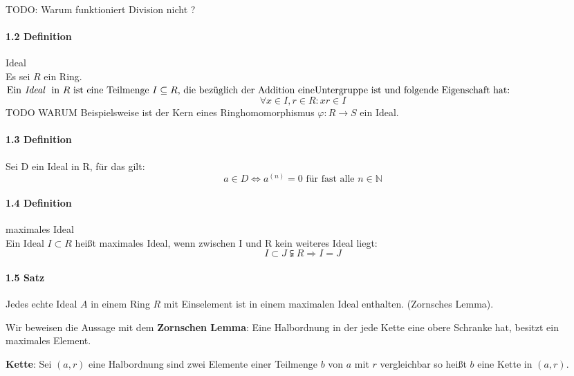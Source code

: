 \documentclass[a4paper]{article}
\begin{document}
TODO: Warum funktioniert Division nicht ? 

\paragraph{1.2 Definition} Ideal \\
Es sei $ R $ ein Ring. \\ 
$ \text{Ein} \textit{ Ideal } \text{ in } R \text{ ist eine Teilmenge } I \subseteq R \text{, die bezüglich der Addition 
eine} \\ \text{Untergruppe ist und folgende Eigenschaft hat:} $
$$ \forall x \in I, r \in R: xr \in I $$
TODO WARUM      Beispielsweise ist der Kern eines Ringhomomorphismus $ \varphi:R \to S $ ein Ideal. 


\paragraph{1.3 Definition} Sei D ein Ideal in R, für das gilt:  
      $$ a \in D \iff a^{(n)} = 0 \text{ für fast alle } n \in \mathbb{N}  $$

\paragraph{1.4 Definition} maximales Ideal \\
Ein Ideal $ I \subset R $ heißt maximales Ideal, wenn zwischen I und R kein weiteres Ideal liegt:
$$ I \subset J \subsetneqq R \Rightarrow I = J$$


\paragraph{1.5 Satz} Jedes echte Ideal $ A $ in einem Ring $ R $ mit Einselement ist in einem maximalen Ideal enthalten. (Zornsches Lemma).
\bigskip

Wir beweisen die Aussage mit dem \textbf{Zornschen Lemma}: Eine Halbordnung in der jede Kette eine obere Schranke hat, besitzt ein maximales Element. 
\smallskip

\textbf{Kette}: Sei $ (a,r) $ eine Halbordnung sind zwei Elemente einer Teilmenge $ b $ von $ a $ mit $ r $ vergleichbar 
so heißt $ b $ eine Kette in $ (a,r) $.
\end{document}
